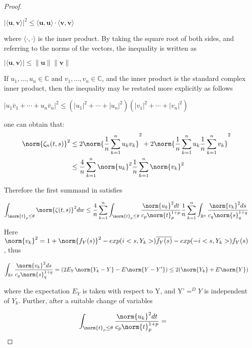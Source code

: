 \begin{proof}
\begin{prop}
$|\langle \mathbf {u} ,\mathbf {v} \rangle |^{2}\leq \langle \mathbf {u} ,\mathbf {u} \rangle \cdot \langle \mathbf {v} ,\mathbf {v} \rangle $

where $ \langle \cdot ,\cdot \rangle $ is the inner product. By taking the square root of both sides, and referring to the norms of the vectors, the inequality is written as \cite{C-S-B_inequality1}\cite{C-S-B_inequality2}

$ |\langle \mathbf {u} ,\mathbf {v} \rangle |\leq \|\mathbf {u} \|\|\mathbf {v} \|$

If $ u_{1},\ldots ,u_{n}\in \mathbb {C} $ and $ v_{1},\ldots ,v_{n}\in \mathbb {C} $, and the inner product is the standard complex inner product, then the inequality may be restated more explicitly as follows 

$ |u_{1}{\bar {v}}_{1}+\cdots +u_{n}{\bar {v}}_{n}|^{2}\leq (|u_{1}|^{2}+\cdots +|u_{n}|^{2})(|v_{1}|^{2}+\cdots +|v_{n}|^{2})$

\end{prop} 

one can obtain that:
\begin{equation}{}
\begin{split}
\norm{\zeta_{n}(t,s)}^{2}&
\leq 2 \norm{\frac{1}{n}\sum_{k=1}^{n}u_{k}v_{k}}^{2} + 2\norm{\frac{1}{n}\sum_{k=1}^{n}u_{k}\frac{1}{n}\sum_{k=1}^{n}v_{k}}^{2} \\
&\leq \frac{4}{n}\sum_{k=1}^{n}\norm{u_{k}}^{2}\frac{1}{n}\sum_{k=1}^{n}\norm{v_{k}}^{2}
\end{split}
\end{equation}

Therefore the first summand in \cite{asymptotic_inequality} satisfies

$$
\int_{\norm{t}_{p}\leq\theta}\norm{\zeta(t,s)}^{2}dw \leq \frac{4}{n}\sum_{k=1}^{n}\int_{\norm{t}_{p}\leq\theta} \frac{\norm{u_{k}}^{2}dt}{c_{p}\norm{t}^{1+p}_{p}}\frac{1}{n}\sum_{k=1}^{n}\int_{\mathbb{R}^{q}}\frac{\norm{v_{k}}^{2}ds}{c_{q}\norm{s}^{1+q}_{q}}
$$

Here $\norm{v_{k}}^{2} = 1 + \norm{f_{Y}(s)}^{2}- exp(i<s,Y_{k}>)\overline{f_{Y}(s)} - exp(-i<s,Y_{k}>)f_{Y}(s)$, thus

$$
\int_{\mathbb{R}^{q}}\frac{\norm{v_{k}}^{2}ds}{c_{q}\norm{s}^{1+q}_{q}} = (2E_{Y}\norm{Y_{k}-Y}- E\norm{Y-Y'}) \leq 2(\norm{Y_{k}}+E\norm{Y})
$$

where the expectation $E_{Y}$ is taken with respect to Y, and Y'$=^{D}Y$ is independent of $Y_{k}$. Further, after a suitable change of variables

\begin{equation}{}
\begin{split}
\int_{\norm{t}_{p}\leq\theta} \frac{\norm{u_{k}}^{2}dt}{c_{p}\norm{t}^{1+p}_{p}} &
= 
\end{split}
\end{equation}
\end{proof}





